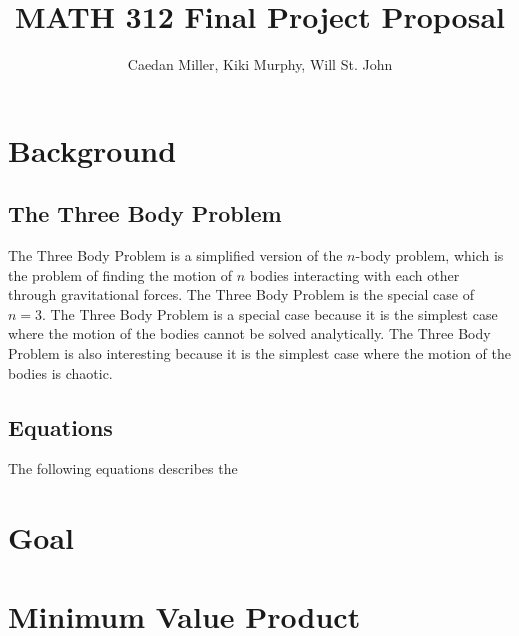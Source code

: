 \documentclass{article}
\author{Caedan Miller, Kiki Murphy, Will St. John}
\title{MATH 312 Final Project Proposal}
\begin{document}
\maketitle
\section{Background}
\subsection{The Three Body Problem}
The Three Body Problem is a simplified version of the $n$-body problem, which is the problem of finding the motion of $n$ bodies interacting with each other through gravitational forces. The Three Body Problem is the special case of $n=3$. The Three Body Problem is a special case because it is the simplest case where the motion of the bodies cannot be solved analytically. The Three Body Problem is also interesting because it is the simplest case where the motion of the bodies is chaotic. 

\subsection{Equations}
The following equations describes the 

\section{Goal}


\section{Minimum Value Product}
\end{document}
